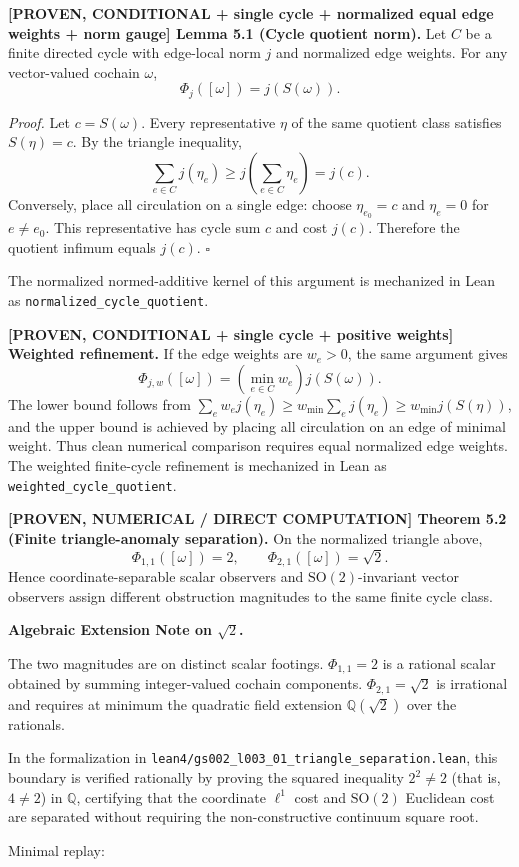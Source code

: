 \documentclass[
  11pt,
]{article}
\renewenvironment{quote}
  {\begin{leftbar}\small}
  {\end{leftbar}}
\begin{document}
\textbf{{[}PROVEN, CONDITIONAL + single cycle + normalized equal edge
weights + norm gauge{]} Lemma 5.1 (Cycle quotient norm).} Let \(C\) be a
finite directed cycle with edge-local norm \(j\) and normalized edge
weights. For any vector-valued cochain \(\omega\), \[
\Phi_j([\omega])=j(S(\omega)).
\]

\emph{Proof.} Let \(c=S(\omega)\). Every representative \(\eta\) of the
same quotient class satisfies \(S(\eta)=c\). By the triangle inequality,
\[
\sum_{e\in C}j(\eta_e)\ge j\left(\sum_{e\in C}\eta_e\right)=j(c).
\] Conversely, place all circulation on a single edge: choose
\(\eta_{e_0}=c\) and \(\eta_e=0\) for \(e\ne e_0\). This representative
has cycle sum \(c\) and cost \(j(c)\). Therefore the quotient infimum
equals \(j(c)\). \(\square\)

The normalized normed-additive kernel of this argument is mechanized in
Lean as \texttt{normalized\_cycle\_quotient}.

\textbf{{[}PROVEN, CONDITIONAL + single cycle + positive weights{]}
Weighted refinement.} If the edge weights are \(w_e>0\), the same
argument gives \[
\Phi_{j,w}([\omega])=
\left(\min_{e\in C}w_e\right)j(S(\omega)).
\] The lower bound follows from
\(\sum_e w_e j(\eta_e)\ge w_{\min}\sum_e j(\eta_e)\ge w_{\min}j(S(\eta))\),
and the upper bound is achieved by placing all circulation on an edge of
minimal weight. Thus clean numerical comparison requires equal
normalized edge weights. The weighted finite-cycle refinement is
mechanized in Lean as \texttt{weighted\_cycle\_quotient}.

\textbf{{[}PROVEN, NUMERICAL / DIRECT COMPUTATION{]} Theorem 5.2 (Finite
triangle-anomaly separation).} On the normalized triangle above, \[
\Phi_{1,1}([\omega])=2,
\qquad
\Phi_{2,1}([\omega])=\sqrt2.
\] Hence coordinate-separable scalar observers and
\(\mathrm{SO}(2)\)-invariant vector observers assign different
obstruction magnitudes to the same finite cycle class.

\begin{quote}
\textbf{Algebraic Extension Note on \(\sqrt{2}\).}

The two magnitudes are on distinct scalar footings. \(\Phi_{1,1} = 2\)
is a rational scalar obtained by summing integer-valued cochain
components. \(\Phi_{2,1} = \sqrt{2}\) is irrational and requires at
minimum the quadratic field extension \(\mathbb{Q}(\sqrt{2})\) over the
rationals.

In the formalization in
\texttt{lean4/gs002\_l003\_01\_triangle\_separation.lean}, this boundary
is verified rationally by proving the squared inequality \(2^2 \ne 2\)
(that is, \(4 \ne 2\)) in \(\mathbb{Q}\), certifying that the coordinate
\(\ell^1\) cost and \(\mathrm{SO}(2)\) Euclidean cost are separated
without requiring the non-constructive continuum square root.

Minimal replay:
\end{quote}
\end{document}
